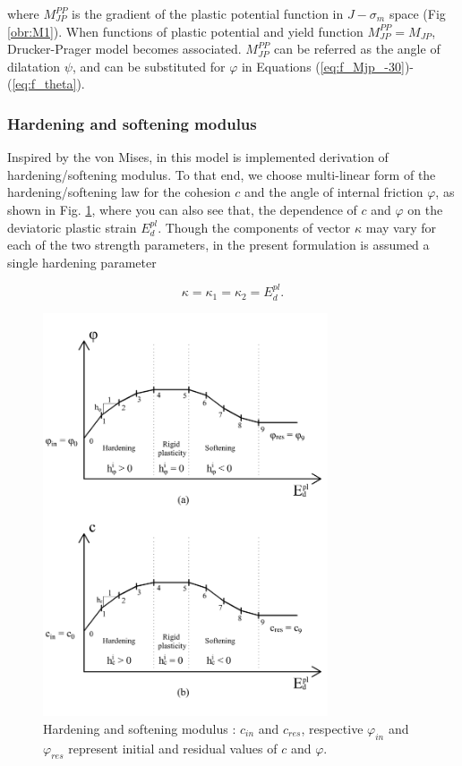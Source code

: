 where $M_{JP}^{PP}$ is the gradient of the plastic potential function in $J-\sigma_m$ space (Fig \ref{obr:M1}). When functions of plastic potential and yield function  $M_{JP}^{PP}=M_{JP}$, Drucker-Prager model becomes associated. $M_{JP}^{PP}$  can be referred as the angle of dilatation $\psi$, and can be substituted for $\varphi$ in Equations (\ref{eq:f_Mjp_-30})-(\ref{eq:f_theta}).
 
\subsubsection{Hardening and softening modulus}
\indent

Inspired by the von Mises, in this model is implemented derivation of hardening/softening modulus. To that end, we choose multi-linear form of the hardening/softening law for the cohesion $c$ and the angle of internal friction $\varphi$, as shown in Fig. \ref{obr:H}, where you can also see that, the dependence of $c$ and $\varphi$ on the deviatoric plastic strain $E_d^{pl}$. Though the components of vector $\kappa$ may vary for each of the two strength parameters, in the present formulation is assumed a single hardening parameter

\begin{equation}\label{eq:kappa}
	\kappa = \kappa_{1} = \kappa_{2} = E_d^{pl}.
\end{equation}

\begin{figure}[h!]
	\centering	
	\includegraphics[width=0.75\textwidth, angle=0]{obrazky/hardening_softening_modulus_my.png}
	\caption[Hardening and softening modulus]{Hardening and softening modulus \cite{geofem}: $c_{in}$ and $c_{res}$, respective $\varphi_{in}$ and $\varphi_{res}$ represent initial and residual values of $c$ and $\varphi$.} \label{obr:H}
\end{figure}
 
